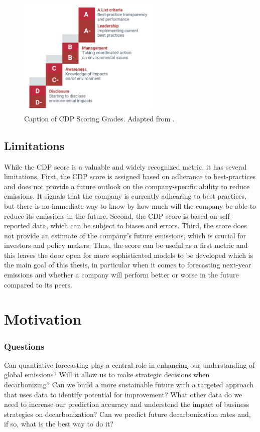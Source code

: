 \begin{figure}[h]
    \centering
    \includegraphics[width=0.6\textwidth]{figures/cdp_scoring.png}
    \caption{Caption of CDP Scoring Grades. Adapted from \cite{CDP2022ScoringPDF}.}
    \label{fig:my_label}
\end{figure}


\subsection{Limitations}


\noindent While the CDP score is a valuable and widely recognized metric, it has several limitations. First, the CDP score is assigned based on adherance to best-practices and does not provide a future outlook on the company-specific ability to reduce emissions. It signals that the company is currently adhearing to best practices, but there is no immediate way to know by how much will the company be able to reduce its emissions in the future. Second, the CDP score is based on self-reported data, which can be subject to biases and errors. Third, the score does not provide an estimate of the company's future emissions, which is crucial for investors and policy makers. Thus, the score can be useful as a first metric and this leaves the door open for more sophisticated models to be developed which is the main goal of this thesis, in particular when it comes to forecasting next-year emissions and whether a company will perform better or worse in the future compared to its peers.


\section{Motivation}
\subsubsection{Questions}
 Can quantiative forecasting play a central role in enhancing our understanding of global emissions? Will it allow us to make strategic decisions when decarbonizing? Can we build a more sustainable future with a targeted approach that uses data to identify potential for improvement? What other data do we need to increase our prediction accuracy and understend the impact of business strategies on decarbonization? Can we predict future decarbonization rates and, if so, what is the best way to do it? \\ 
